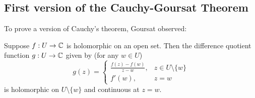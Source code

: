 \documentclass[10pt, a4paper]{article}
\begin{document}
\subsection{First version of the Cauchy-Goursat Theorem}
To prove a version of Cauchy's theorem,
Goursat observed:

\begin{lemma}
    Suppose $f : U \to \mathbb{C}$ is holomorphic on an open set.
    Then the difference quotient function $g : U \to \mathbb{C}$ given by
    (for any $w \in U$)
    \[
    g(z) = \begin{cases}
        \frac{f(z) - f(w)}{z - w}, & z \in U \setminus \{w\} \\
        f'(w), & z = w
    \end{cases}
    \]
    is holomorphic on $U \setminus \{w\}$ and continuous at $z = w$.
\end{lemma}
\end{document}
